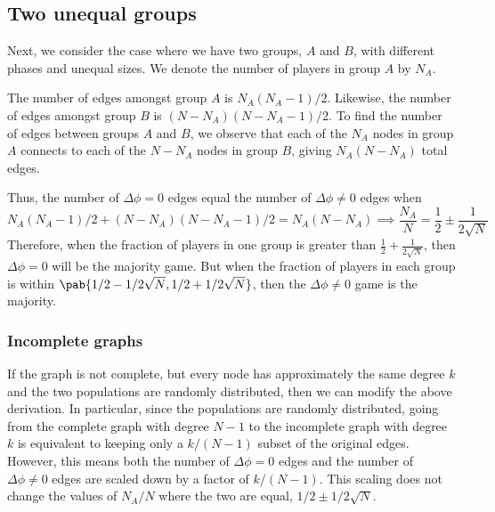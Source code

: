 \subsection{Two unequal groups}
\label{sec:two_unequal_groups}
Next, we consider the case where we have two groups, $A$ and $B$,
with different phases and unequal sizes.
We denote the number of players in group $A$ by $N_A$.

The number of edges amongst group $A$ is $N_A (N_A - 1)/2$.
Likewise, the number of edges amongst group $B$ is
$(N-N_A) (N - N_A - 1)/2$.
To find the number of edges between groups $A$ and $B$,
we observe that each of the $N_A$ nodes in group $A$
connects to each of the $N - N_A$ nodes in group $B$,
giving $N_A (N - N_A)$ total edges.

Thus, the number of $\Delta \phi = 0$ edges
equal the number of $\Delta \phi \neq 0$ edges when
\begin{equation*}
  N_A (N_A - 1)/2 + (N - N_A) (N - N_A - 1)/2 = N_A (N - N_A)
  \implies \frac{N_A}{N} = \frac{1}{2} \pm \frac{1}{2 \sqrt{N}}
\end{equation*}
Therefore, when the fraction of players in one group is greater than
$\frac{1}{2} + \frac{1}{2\sqrt{N}}$,
then $\Delta \phi = 0$ will be the majority game.
But when the fraction of players in each group is within
$\pab{1/2 - 1/2\sqrt{N}, 1/2 + 1/2\sqrt{N}}$,
then the $\Delta \phi \neq 0$ game is the majority.

\subsubsection{Incomplete graphs}
\label{sec:two_unequal_groups_incomplete}
If the graph is not complete,
but every node has approximately the same degree $k$
and the two populations are randomly distributed,
then we can modify the above derivation.
In particular, since the populations are randomly distributed,
going from the complete graph with degree $N-1$
to the incomplete graph with degree $k$
is equivalent to keeping only a $k/(N-1)$ subset
of the original edges.
However, this means both the number of $\Delta \phi = 0$ edges
and the number of $\Delta \phi \neq 0$ edges
are scaled down by a factor of $k/(N-1)$.
This scaling does not change the values of $N_A/N$
where the two are equal, \ie $1/2 \pm 1/2\sqrt{N}$.
